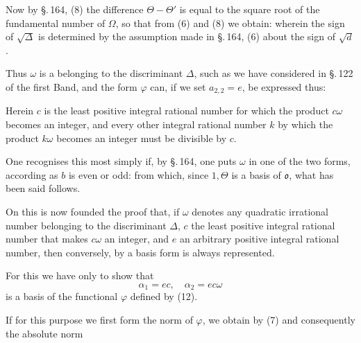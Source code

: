 Now by \S.\,164, (8) the difference $\Theta - \Theta'$ is equal to the square root of the fundamental number of $\Omega$, so that from (6) and (8) we obtain:
wherein the sign of $\sqrt{\Delta}$ is determined by the assumption made in \S.\,164, (6) about the sign of $\sqrt{d}$.

Thus $\omega$ is a  belonging to the discriminant $\Delta$, such as we have considered in \S.\,122 of the first Band, and the form $\varphi$ can, if we set $a_{2,2}=e$, be expressed thus:

Herein $c$ is the least positive integral rational number for which the product $c\omega$ becomes an integer, and every other integral rational number $k$ by which the product $k\omega$ becomes an integer must be divisible by $c$.

One recognises this most simply if, by \S.\,164, one puts $\omega$ in one of the two forms, according as $b$ is even or odd:
from which, since $1, \Theta$ is a basis of $\mathfrak{o}$, what has been said follows.

On this is now founded the proof that, if $\omega$ denotes any quadratic irrational number belonging to the discriminant $\Delta$, $c$ the least positive integral rational number that makes $c\omega$ an integer, and $e$ an arbitrary positive integral rational number, then conversely, by
a basis form is always represented.

For this we have only to show that
\[
\alpha_1 = ec, \quad \alpha_2 = ec\omega
\]
is a basis of the functional $\varphi$ defined by (12).

If for this purpose we first form the norm of $\varphi$, we obtain by (7)
and consequently the absolute norm
